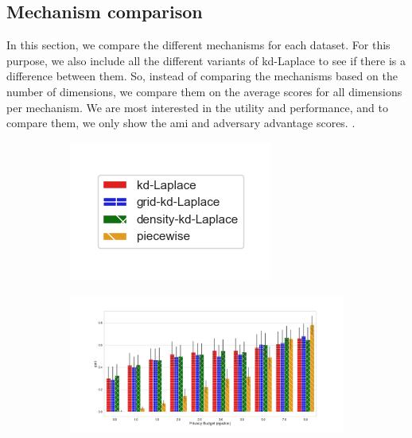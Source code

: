 {\subsection{Mechanism comparison}
In this section, we compare the different mechanisms for each dataset.
For this purpose, we also include all the different variants of kd-Laplace to see if there is a difference between them.
So, instead of comparing the mechanisms based on the number of dimensions, we compare them on the average scores for all dimensions per mechanism.
We are most interested in the utility and performance, and to compare them, we only show the \gls{ami} and adversary advantage scores.
.
\begin{figure}[H]
  \centering
  \begin{subfigure}{0.30\textwidth}
    \includegraphics[width=\textwidth]{Results/kd-laplace/ami_bar_comparison_legend.png}
  \end{subfigure}
  \begin{subfigure}{1\textwidth}
    \includegraphics[width=1\textwidth]{Results/nd-laplace/ami_seeds-dataset_comparison.png}

\end{subfigure}
\end{figure}}
